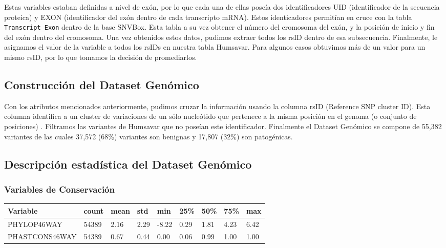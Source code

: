 Estas variables estaban definidas a nivel de exón, por lo que cada una de ellas poseía dos  identificadores UID (identificador de la secuencia proteica) y EXON (identificador del exón dentro de cada transcripto mRNA). Estos identicadores permitían en cruce con la tabla \texttt{Transcript\_Exon} dentro de la base SNVBox. Esta tabla a su vez obtener el número del cromosoma del exón, y la posición de inicio y fin del exón dentro del cromosoma. Una vez obtenidos estos datos, pudimos extraer todos los rsID dentro de esa subsecuencia. Finalmente, le asignamos el valor de la variable a todos los rsIDs en nuestra tabla Humsavar. Para algunos casos obtuvimos más de un valor para un mismo rsID, por lo que tomamos la decisión de promediarlos.


\subsection{Construcción del Dataset Genómico}

Con los atributos mencionados anteriormente, pudimos cruzar la información usando la columna rsID (Reference SNP cluster ID). Esta columna identifica a un cluster de variaciones de un sólo nucleótido que pertenece a la misma posición en el genoma (o conjunto de posiciones) \cite{Ostell2007}. Filtramos las variantes de Humsavar que no poseían este identificador. Finalmente el Dataset Genómico se compone de 55,382 variantes de las cuales 37,572 (68\%) variantes son benignas y 17,807 (32\%) son patogénicas.

\subsection{Descripción estadística del Dataset Genómico}

\subsubsection{Variables de Conservación}
\begin{table}[H]
\centering
\begin{tabular}{|l|l|l|l|l|l|l|l|l|}
\hline
Variable & count & mean   & std    & min    & 25\%  & 50\%   & 75\%   & max    \\ \hline
PHYLOP46WAY &  54389 &  2.16 &  2.29 & -8.22 &  0.29 &  1.81 &  4.23 &  6.42 \\ \hline
PHASTCONS46WAY &  54389 &  0.67 &  0.44 &  0.00 &  0.06 &  0.99 &  1.00 &  1.00 \\ \hline
\end{tabular}
\end{table}



